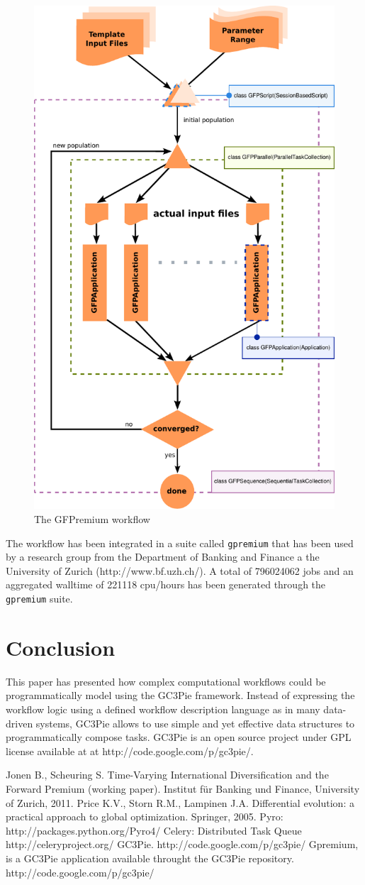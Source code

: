 \documentclass{PoS}
\begin{document}
\begin{figure}
\includegraphics[width=.6\textwidth]{gc3pie_fig1.pdf}
\caption{The GFPremium workflow}
\label{fig1}
\end{figure}


The workflow has been integrated in a suite called \texttt{gpremium} that has
been used by a research group from the Department of Banking and
Finance a the University of Zurich
(http://www.bf.uzh.ch/). A
total of 796024062 jobs and an aggregated walltime of 221118 cpu/hours
has been generated through the \texttt{gpremium} suite.


\section{Conclusion}
This paper has presented how complex computational workflows could be
programmatically model using the GC3Pie framework. Instead of
expressing the workflow logic using a defined workflow description
language as in many data-driven systems, GC3Pie allows to use simple
and yet effective data structures to programmatically compose tasks.
GC3Pie is an open source project under GPL license available at at
http://code.google.com/p/gc3pie/.


\begin{thebibliography}{99}
   Jonen B., Scheuring S. Time-Varying International
    Diversification and the Forward Premium (working paper). Institut
    für Banking und Finance, University of Zurich, 2011.
   Price K.V., Storn R.M., Lampinen J.A. Differential
    evolution: a practical approach to global optimization. Springer,
    2005.
   Pyro: http://packages.python.org/Pyro4/
   Celery: Distributed Task Queue
    http://celeryproject.org/
   GC3Pie. http://code.google.com/p/gc3pie/
   Gpremium, is a GC3Pie application available
    throught the GC3Pie repository. http://code.google.com/p/gc3pie/
\end{thebibliography}
\end{document}
